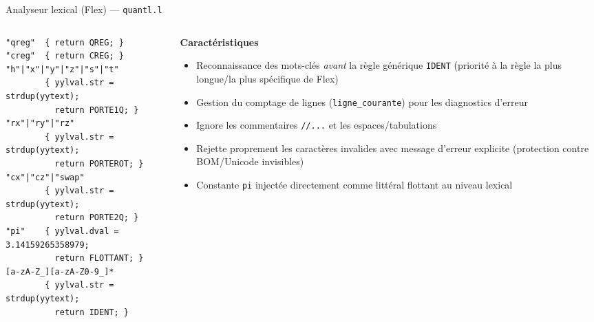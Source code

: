 \documentclass[10pt]{beamer}
\begin{document}
\begin{frame}[fragile]{Analyseur lexical (Flex) --- \texttt{quantl.l}}
  \begin{columns}[T]
    \begin{column}{0.55\textwidth}
\begin{lstlisting}[style=cstyle]
"qreg"  { return QREG; }
"creg"  { return CREG; }
"h"|"x"|"y"|"z"|"s"|"t"
        { yylval.str = strdup(yytext);
          return PORTE1Q; }
"rx"|"ry"|"rz"
        { yylval.str = strdup(yytext);
          return PORTEROT; }
"cx"|"cz"|"swap"
        { yylval.str = strdup(yytext);
          return PORTE2Q; }
"pi"    { yylval.dval = 3.14159265358979;
          return FLOTTANT; }
[a-zA-Z_][a-zA-Z0-9_]*
        { yylval.str = strdup(yytext);
          return IDENT; }
\end{lstlisting}
    \end{column}
    \begin{column}{0.45\textwidth}
      \textbf{Caractéristiques}
      \begin{itemize}
        \small
        \item Reconnaissance des mots-clés \emph{avant} la règle générique \texttt{IDENT} (priorité à la règle la plus longue/la plus spécifique de Flex)
        \item Gestion du comptage de lignes (\texttt{ligne\_courante}) pour les diagnostics d'erreur
        \item Ignore les commentaires \texttt{//...} et les espaces/tabulations
        \item Rejette proprement les caractères invalides avec message d'erreur explicite (protection contre BOM/Unicode invisibles)
        \item Constante \texttt{pi} injectée directement comme littéral flottant au niveau lexical
      \end{itemize}
    \end{column}
  \end{columns}
\end{frame}
\end{document}
